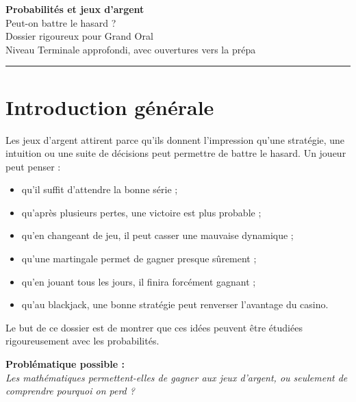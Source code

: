 \documentclass[11pt,a4paper]{article}
\begin{document}
\begin{center}
    {\Huge \textbf{Probabilités et jeux d'argent}}\\[0.2cm]
    {\Large Peut-on battre le hasard ?}\\[0.2cm]
    {\large Dossier rigoureux pour Grand Oral}\\
    {\large Niveau Terminale approfondi, avec ouvertures vers la prépa}\\[0.4cm]
    \rule{0.85\linewidth}{0.5pt}
\end{center}

\vspace{0.4cm}

\tableofcontents

\newpage

\section{Introduction générale}

Les jeux d'argent attirent parce qu'ils donnent l'impression qu'une stratégie, une intuition ou une suite de décisions peut permettre de battre le hasard. Un joueur peut penser :

\begin{itemize}
    \item qu'il suffit d'attendre la bonne série ;
    \item qu'après plusieurs pertes, une victoire est plus probable ;
    \item qu'en changeant de jeu, il peut casser une mauvaise dynamique ;
    \item qu'une martingale permet de gagner presque sûrement ;
    \item qu'en jouant tous les jours, il finira forcément gagnant ;
    \item qu'au blackjack, une bonne stratégie peut renverser l'avantage du casino.
\end{itemize}

Le but de ce dossier est de montrer que ces idées peuvent être étudiées rigoureusement avec les probabilités.

\begin{center}
\Large
\textbf{Problématique possible :}\\[0.2cm]
\textit{Les mathématiques permettent-elles de gagner aux jeux d'argent, ou seulement de comprendre pourquoi on perd ?}
\end{center}
\end{document}
